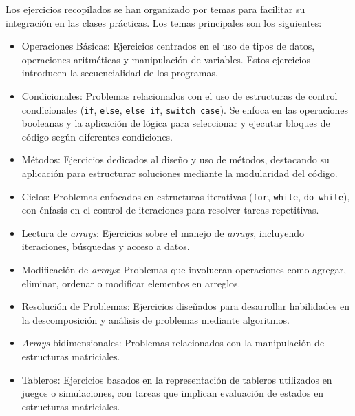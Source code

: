 Los ejercicios recopilados se han organizado por temas para facilitar su integración en las clases prácticas. Los temas principales son los siguientes: 

\begin{itemize}  
    \item Operaciones Básicas:  
    Ejercicios centrados en el uso de tipos de datos, operaciones aritméticas y manipulación de variables. Estos ejercicios introducen la secuencialidad de los programas.  

    \item Condicionales:  
    Problemas relacionados con el uso de estructuras de control condicionales (\texttt{if}, \texttt{else}, \texttt{else if}, \texttt{switch case}). Se enfoca en las operaciones booleanas y la aplicación de lógica para seleccionar y ejecutar bloques de código según diferentes condiciones.

    \item Métodos:
    Ejercicios dedicados al diseño y uso de métodos, destacando su aplicación para estructurar soluciones mediante la modularidad del código.  

    \item Ciclos:  
    Problemas enfocados en estructuras iterativas (\texttt{for}, \texttt{while}, \texttt{do-while}), con énfasis en el control de iteraciones para resolver tareas repetitivas.

    \item Lectura de \textit{arrays}:  
    Ejercicios sobre el manejo de \textit{arrays}, incluyendo iteraciones, búsquedas y acceso a datos.  

    \item Modificación de \textit{arrays}:  
    Problemas que involucran operaciones como agregar, eliminar, ordenar o modificar elementos en arreglos.  

    \item Resolución de Problemas:  
    Ejercicios diseñados para desarrollar habilidades en la descomposición y análisis de problemas mediante algoritmos.

    \item \textit{Arrays} bidimensionales:  
    Problemas relacionados con la manipulación de estructuras matriciales.  

    \item Tableros:  
    Ejercicios basados en la representación de tableros utilizados en juegos o simulaciones, con tareas que implican evaluación de estados en estructuras matriciales.
\end{itemize}  

